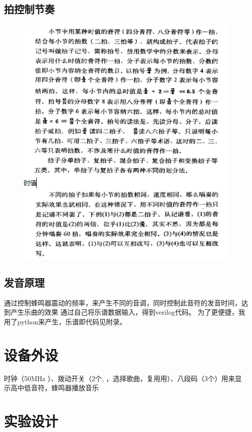 \documentclass[UTF8]{ctexart}
\begin{document}
\subsection{拍控制节奏}
\begin{figure}[H]
  \centering
  \includegraphics[width=1\textwidth]{pai.png}
\end{figure}

\subsection{发音原理}
通过控制蜂鸣器震动的频率，来产生不同的音调，同时控制此音符的发音时间，达到产生乐曲的效果
通过自己将乐谱数据输入，得到verilog代码。 为了更便捷，我用了python来产生，乐谱即代码见附录。
\section{设备外设}
时钟（50MHz ）、拨动开关（2个, ，选择歌曲，复用用）、八段码（3个）用来显示高中低音符，蜂鸣器播放音乐

\section{实验设计}
\end{document}
